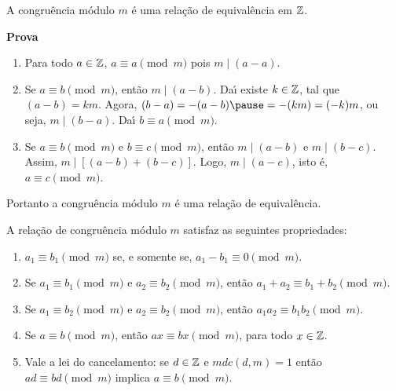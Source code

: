 \documentclass{beamer}
\begin{document}
    \begin{frame}
        \begin{proposicao}
            A congru{\^e}ncia m{\'o}dulo $m$ {\'e} uma rela{\c c}{\~a}o de equival{\^e}ncia em $\mathbb{Z}$.\pause
        \end{proposicao}
        \noindent\textbf{Prova}
        \begin{enumerate}[label={\roman*})]
            \item Para todo $a \in \mathbb{Z}$, $a\equiv a\pmod{m}$ \pause pois $m\mid (a-a)$.\pause \vspace{.3cm}

            \item Se $a\equiv b\pmod{m}$, \pause ent{\~a}o $m\mid (a - b)$. \pause Da{\'\i} existe $k \in \mathbb{Z}$, \pause tal que $(a - b) = km$. \pause Agora, $(b - a) = -(a - b) \pause = -(km) = (-k)m$, \pause ou seja, $m \mid (b - a)$. \pause Da{\'\i} $b\equiv a \pmod{m}$.\pause \vspace{.3cm}
            
            \item Se $a\equiv b\pmod{m}$ \pause e $b\equiv c\pmod{m}$, \pause ent{\~a}o $m\mid (a-b)$ \pause e $m\mid (b-c)$. \pause Assim, $m\mid [(a-b)+(b-c)]$. \pause Logo, $m\mid (a-c)$, \pause isto {\'e}, $a\equiv c\pmod{m}$.\pause
        \end{enumerate}
        Portanto a congru{\^e}ncia m{\'o}dulo $m$ {\'e} uma rela{\c c}{\~a}o de equival{\^e}ncia.\hspace{.5cm} \qedsymbol\pause
    \end{frame}
    \begin{frame}
        \begin{teorema}
            A rela{\c c}{\~a}o de congru{\^e}ncia m{\'o}dulo $m$ satisfaz as seguintes propriedades:\pause
            \begin{enumerate}[label={\roman*})]
                \item $a_{1}\equiv b_{1}\pmod{m}$ se, e somente se, $a_{1}-b_{1}\equiv 0\pmod{m}$.\pause \vspace{.3cm}

                \item Se $a_{1}\equiv b_{1}\pmod{m}$ e $a_{2}\equiv b_{2}\pmod{m}$, ent{\~a}o $a_{1}+a_{2}\equiv b_{1}+b_{2}\pmod{m}$.\pause \vspace{.3cm}
                
                \item Se $a_{1}\equiv b_{2}\pmod{m}$ e $a_{2}\equiv b_{2}\pmod{m}$, ent{\~a}o $a_{1}a_{2}\equiv b_{1}b_{2}\pmod{m}$.\label{item_provado}\pause \vspace{.3cm}

                \item Se $a\equiv b\pmod{m}$, ent{\~a}o $ax\equiv bx\pmod{m}$, para todo $x \in \mathbb{Z}$.\pause \vspace{.3cm}

                \item Vale a lei do cancelamento: se $d \in \mathbb{Z}$ e $mdc(d,m) = 1$ ent{\~a}o $ad \equiv bd \pmod{m}$ implica $a\equiv b \pmod{m}$.\pause
            \end{enumerate}
        \end{teorema}
    \end{frame}
\end{document}
